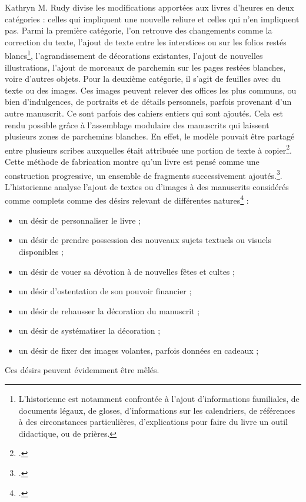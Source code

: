 \documentclass[a4paper,12pt,twoside]{book}
\begin{document}
Kathryn M. Rudy divise les modifications apportées aux livres d'heures en deux catégories : celles qui impliquent une nouvelle reliure et celles qui n'en impliquent pas. Parmi la première catégorie, l'on retrouve des changements comme la correction du texte, l'ajout de texte entre les interstices ou sur les folios restés blancs\footnote{L'historienne est notamment confrontée à l'ajout d'informations familiales, de documents légaux, de gloses, d'informations sur les calendriers, de références à des circonstances particulières, d'explications pour faire du livre un outil didactique, ou de prières.}, l'agrandissement de décorations existantes, l'ajout de nouvelles illustrations, l'ajout de morceaux de parchemin sur les pages restées blanches, voire d'autres objets. Pour la deuxième catégorie, il s'agit de feuilles avec du texte ou des images. Ces images peuvent relever des offices les plus communs, ou bien d'indulgences, de portraits et de détails personnels, parfois provenant d'un autre manuscrit. Ce sont parfois des cahiers entiers qui sont ajoutés. Cela est rendu possible grâce à l'assemblage modulaire des manuscrits qui laissent plusieurs zones de parchemins blanches. En effet, le modèle pouvait être partagé entre plusieurs scribes auxquelles était attribuée une portion de texte à copier\footcite[p. 89]{livre_medie}. Cette méthode de fabrication montre qu'un livre est pensé comme une construction progressive, un ensemble de fragments successivement ajoutés.\footcite[p. 9]{Piety_in_Pieces}. 
L'historienne analyse l'ajout de textes ou d'images à des manuscrits considérés comme complets comme des désirs relevant de différentes natures\footcite[p. 9]{Piety_in_Pieces} :
\begin{itemize}
    \item un désir de personnaliser le livre ;
    \item un désir de prendre possession des nouveaux sujets textuels ou visuels disponibles ;
    \item un désir de vouer sa dévotion à de nouvelles fêtes et cultes ;
    \item un désir d'ostentation de son pouvoir financier ;
    \item un désir de rehausser la décoration du manuscrit ;
    \item un désir de systématiser la décoration ;
    \item un désir de fixer des images volantes, parfois données en cadeaux ; 
\end{itemize}
Ces désirs peuvent évidemment être mêlés. 
\end{document}

